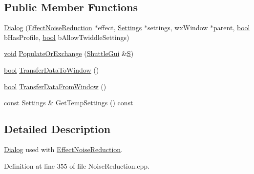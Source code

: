 \subsection*{Public Member Functions}
\begin{DoxyCompactItemize}
\item 
\hyperlink{class_effect_noise_reduction_1_1_dialog_a861517942c2b428f9cbc23f285193550}{Dialog} (\hyperlink{class_effect_noise_reduction}{Effect\+Noise\+Reduction} $\ast$effect, \hyperlink{class_effect_noise_reduction_1_1_settings}{Settings} $\ast$settings, wx\+Window $\ast$parent, \hyperlink{mac_2config_2i386_2lib-src_2libsoxr_2soxr-config_8h_abb452686968e48b67397da5f97445f5b}{bool} b\+Has\+Profile, \hyperlink{mac_2config_2i386_2lib-src_2libsoxr_2soxr-config_8h_abb452686968e48b67397da5f97445f5b}{bool} b\+Allow\+Twiddle\+Settings)
\item 
\hyperlink{sound_8c_ae35f5844602719cf66324f4de2a658b3}{void} \hyperlink{class_effect_noise_reduction_1_1_dialog_a46e0e7c4cf0672e2a6992b22b637633e}{Populate\+Or\+Exchange} (\hyperlink{class_shuttle_gui}{Shuttle\+Gui} \&\hyperlink{xlftab_8c_af933676109efed7ab34cea71d748a517}{S})
\item 
\hyperlink{mac_2config_2i386_2lib-src_2libsoxr_2soxr-config_8h_abb452686968e48b67397da5f97445f5b}{bool} \hyperlink{class_effect_noise_reduction_1_1_dialog_a12e2a8c9812c5905791fe4127130d4a6}{Transfer\+Data\+To\+Window} ()
\item 
\hyperlink{mac_2config_2i386_2lib-src_2libsoxr_2soxr-config_8h_abb452686968e48b67397da5f97445f5b}{bool} \hyperlink{class_effect_noise_reduction_1_1_dialog_a3a77cd1c05ba89b3b9fc9572fd1c5f58}{Transfer\+Data\+From\+Window} ()
\item 
\hyperlink{getopt1_8c_a2c212835823e3c54a8ab6d95c652660e}{const} \hyperlink{class_effect_noise_reduction_1_1_settings}{Settings} \& \hyperlink{class_effect_noise_reduction_1_1_dialog_ae1564fa76edd879a9f64cb81f976f075}{Get\+Temp\+Settings} () \hyperlink{getopt1_8c_a2c212835823e3c54a8ab6d95c652660e}{const} 
\end{DoxyCompactItemize}


\subsection{Detailed Description}
\hyperlink{class_effect_noise_reduction_1_1_dialog}{Dialog} used with \hyperlink{class_effect_noise_reduction}{Effect\+Noise\+Reduction}. 

Definition at line 355 of file Noise\+Reduction.\+cpp.



